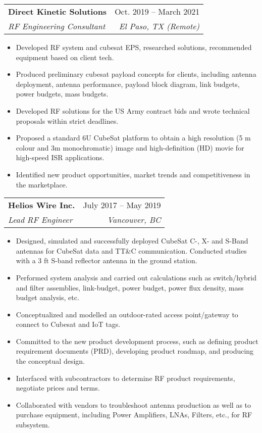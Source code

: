 \documentclass[letterpaper,11pt]{article}
\makeatletter
\newcommand{\resumeItem}[1]{
  \item\small{
    {#1 \vspace{-2pt}}
  }
}
\newcommand{\resumeSubheading}[4]{
  \vspace{-2pt}\item
    \begin{tabular*}{0.97\textwidth}[t]{l@{\extracolsep{\fill}}r}
      \textbf{#1} & #2 \\
      \textit{\small#3} & \textit{\small #4} \\
    \end{tabular*}\vspace{-7pt}
}
\newcommand{\resumeSubSubheading}[2]{
    \item
    \begin{tabular*}{0.97\textwidth}{l@{\extracolsep{\fill}}r}
      \textit{\small#1} & \textit{\small #2} \\
    \end{tabular*}\vspace{-7pt}
}
\newcommand{\resumeSubHeadingListEnd}{\end{itemize}}
\newcommand{\resumeItemListStart}{\begin{itemize}}
\newcommand{\resumeItemListEnd}{\end{itemize}\vspace{-5pt}}
\makeatother
\begin{document}

    \resumeSubheading
      {Direct Kinetic Solutions}{Oct. 2019 -- March 2021}
      {RF Engineering Consultant}{El Paso, TX (Remote)}
      \resumeItemListStart
        \resumeItem{Developed RF system and cubesat EPS, researched solutions, recommended equipment  based on client tech.}
        \resumeItem{Produced preliminary cubesat payload concepts for clients, including antenna deployment, antenna performance, payload block diagram, link budgets, power budgets, mass budgets.}
        \resumeItem{Developed RF solutions for the US Army contract bids and wrote technical proposals within strict deadlines.}
        \resumeItem{Proposed a standard 6U CubeSat platform to obtain a high resolution (5 m colour and 3m monochromatic) image and high-definition (HD) movie for high-speed ISR applications.}
        \resumeItem{Identified new product opportunities, market trends and competitiveness in the marketplace.}
    \resumeItemListEnd

    \resumeSubheading
      {Helios Wire Inc.}{July 2017 -- May 2019}
      {Lead RF Engineer}{Vancouver, BC}
      \resumeItemListStart
        \resumeItem{Designed, simulated and successfully deployed CubeSat C-, X- and S-Band antennas for CubeSat data and TT\&C communication. Conducted studies with a 3 ft S-band reflector antenna in the ground station.}
        \resumeItem{Performed system analysis and carried out calculations such as switch/hybrid and filter assemblies, link-budget, power budget, power flux density, mass budget analysis, etc.}
        \resumeItem{Conceptualized and modelled an outdoor-rated access point/gateway to connect to Cubesat and IoT tags.}
        \resumeItem{Committed to the new product development process, such as defining product requirement documents (PRD), developing product roadmap, and producing the conceptual design.}
        \resumeItem{Interfaced with subcontractors to determine RF product requirements, negotiate prices and terms.}
        \resumeItem{Collaborated with vendors to troubleshoot antenna production as well as to purchase equipment, including Power Amplifiers, LNAs, Filters, etc., for RF subsystem.}
      \resumeItemListEnd
\end{document}
